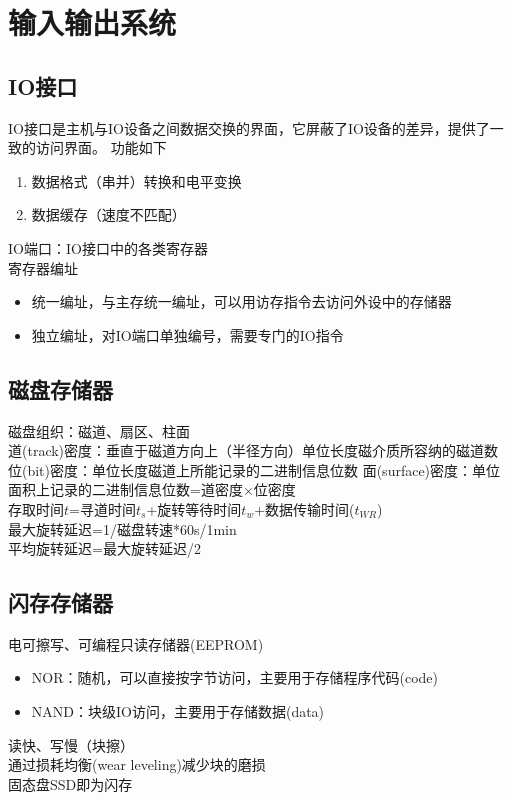 
\section{输入输出系统}
\subsection{IO接口}
IO接口是主机与IO设备之间数据交换的界面，它屏蔽了IO设备的差异，提供了一致的访问界面。
功能如下
\begin{enumerate}
	\item 数据格式（串并）转换和电平变换
	\item 数据缓存（速度不匹配）
\end{enumerate}
IO端口：IO接口中的各类寄存器\\
寄存器编址
\begin{itemize}
	\item 统一编址，与主存统一编址，可以用访存指令去访问外设中的存储器
	\item 独立编址，对IO端口单独编号，需要专门的IO指令
\end{itemize}

\subsection{磁盘存储器}
磁盘组织：磁道、扇区、柱面\\
道(track)密度：垂直于磁道方向上（半径方向）单位长度磁介质所容纳的磁道数\\
位(bit)密度：单位长度磁道上所能记录的二进制信息位数
面(surface)密度：单位面积上记录的二进制信息位数=道密度$\times$位密度\\
存取时间$t$=寻道时间$t_s$+旋转等待时间$t_w$+数据传输时间($t_{WR}$)\\
最大旋转延迟=1/磁盘转速*60s/1min\\
平均旋转延迟=最大旋转延迟/2

\subsection{闪存存储器}
电可擦写、可编程只读存储器(EEPROM)
\begin{itemize}
	\item NOR：随机，可以直接按字节访问，主要用于存储程序代码(code)
	\item NAND：块级IO访问，主要用于存储数据(data)
\end{itemize}
读快、写慢（块擦）\\
通过损耗均衡(wear leveling)减少块的磨损\\
固态盘SSD即为闪存


